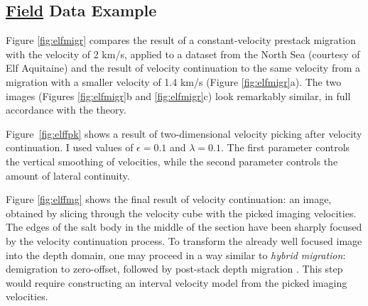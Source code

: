 
\subsection{\uline{Field} Data Example}

Figure \ref{fig:elfmigr} compares the result of a constant-velocity prestack
migration with the velocity of 2 km/s, applied to a dataset from the North Sea
(courtesy of Elf Aquitaine) and the result of velocity continuation to the
same velocity from a migration with a smaller velocity of 1.4 km/s (Figure
\ref{fig:elfmigr}a). The two images (Figures \ref{fig:elfmigr}b and
\ref{fig:elfmigr}c) look remarkably similar, in full accordance with the
theory.


Figure~\ref{fig:elffpk} shows a result of two-dimensional velocity
picking after velocity continuation. I used values of $\epsilon=0.1$
and $\lambda=0.1$. The first parameter controls the vertical smoothing
of velocities, while the second parameter controls the amount of
lateral continuity.





Figure \ref{fig:elffmg} shows the final result of velocity
continuation: an image, obtained by slicing through the velocity cube
with the picked imaging velocities. The edges of the salt body in the middle
of the section have been sharply focused by the velocity
continuation process. To transform the already well focused image into the
depth domain, one may proceed in a way similar to
\emph{hybrid migration}: demigration to zero-offset, followed by
post-stack depth migration \cite{GEO62-02-05680576}. This step
would require constructing an interval velocity model from the picked imaging
velocities.


